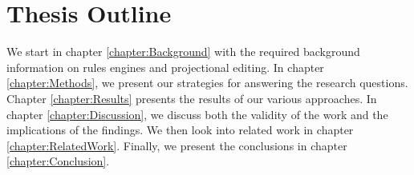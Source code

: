 \section{Thesis Outline}

We start in chapter \ref{chapter:Background} with the required background information on rules engines and projectional editing.
In chapter \ref{chapter:Methods}, we present our strategies for answering the research questions.
Chapter \ref{chapter:Results} presents the results of our various approaches.
In chapter \ref{chapter:Discussion}, we discuss both the validity of the work and the implications of the findings.
We then look into related work in chapter \ref{chapter:RelatedWork}.
Finally, we present the conclusions in chapter \ref{chapter:Conclusion}.
